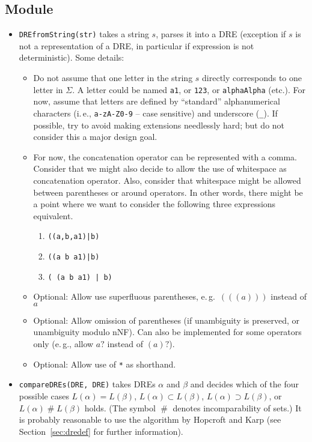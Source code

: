 \documentclass[a4paper,11pt, svgnames,titlepage]{article}
\DeclareMathOperator{\incomp}{\#}
\begin{document}
\subsection{Module}\label{sec:des:mod}
\begin{itemize}
	\item\texttt{DREfromString(str)} takes a string $s$, parses it into a DRE (exception if $s$ is not a representation of a DRE, in particular if expression is not deterministic). Some details:
	\begin{itemize}
		\item Do not assume that one letter in the string $s$ directly corresponds to one letter in $\Sigma$. A letter could be named \texttt{a1}, or \texttt{123}, or \texttt{alphaAlpha} (etc.). For now, assume that letters are defined by ``standard'' alphanumerical characters (i.\,e., \texttt{a-zA-Z0-9} -- case sensitive) and underscore (\texttt{\_}). If possible, try to avoid making extensions needlessly hard; but do not consider this a major design goal.
		\item For now, the concatenation operator can be represented with a comma. Consider that we might also decide to allow the use of whitespace as concatenation operator. Also, consider that whitespace might be allowed between parentheses or around operators. In other words, there might be a point where we want to consider the following three expressions equivalent. \begin{enumerate}
			\item \texttt{((a,b,a1)|b)}
			\item \texttt{((a b a1)|b)}
			\item \texttt{( (a b a1) | b)}
		\end{enumerate} 
		\item Optional: Allow use superfluous parentheses, e.\,g.\ $(((a)))$ instead of $a$
		\item Optional: Allow omission of parentheses (if unambiguity is preserved, or unambiguity modulo nNF). Can also be implemented for some operators only (e.\,g., allow $a?$ instead of $(a)?$).
		\item Optional: Allow use of \texttt{*} as shorthand. 
	\end{itemize}
		\item\texttt{compareDREs(DRE, DRE)}  takes DREs $\alpha$ and $\beta$ and decides which of the four possible cases $L(\alpha)=L(\beta)$, $L(\alpha)\subset L(\beta)$, $L(\alpha)\supset L(\beta)$, or $L(\alpha)\incomp L(\beta)$ holds. (The symbol $\incomp$ denotes incomparability of sets.)  It is probably reasonable to use the algorithm by Hopcroft and Karp (see Section~\ref{sec:dredef} for further information).
\end{itemize}
\end{document}
